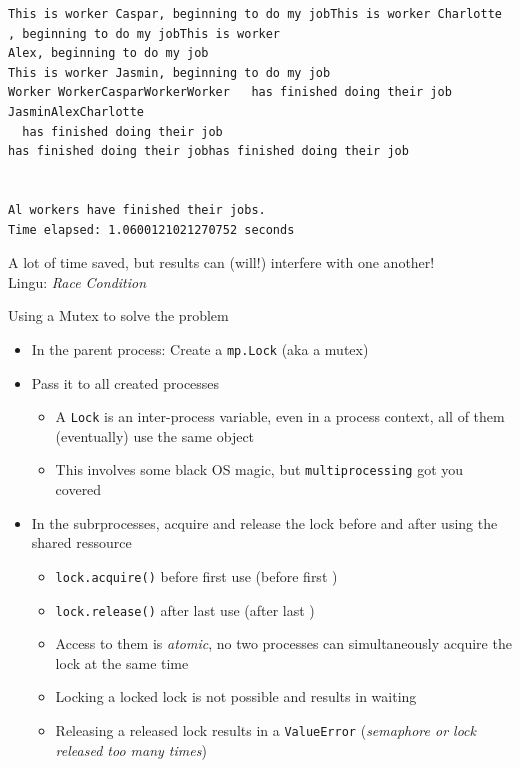 
\begin{frame}[fragile]
%
\begin{cmdbox}
\begin{verbatim}
This is worker Caspar, beginning to do my jobThis is worker Charlotte
, beginning to do my jobThis is worker 
Alex, beginning to do my job
This is worker Jasmin, beginning to do my job
Worker WorkerCasparWorkerWorker   has finished doing their job JasminAlexCharlotte
  has finished doing their job 
has finished doing their jobhas finished doing their job


Al workers have finished their jobs.
Time elapsed: 1.0600121021270752 seconds
\end{verbatim}
\end{cmdbox}

\begin{center}
\Thus A lot of time saved, but results can (will!) interfere with one another!\\
\Thus Lingu: \emph{Race Condition}
\end{center}
%
\end{frame}


\begin{frame}[fragile]{Using a Mutex to solve the problem}
%
\begin{itemize}
\item In the parent process: Create a \texttt{mp.Lock} (aka a mutex)
\item Pass it to all created processes
	\begin{itemize}
	\item A \texttt{Lock} is an inter-process variable, \ie even in a process context, all of them (eventually) use the same object
	\item This involves some black OS magic, but \texttt{multiprocessing} got you covered
	\end{itemize}
\item In the subrprocesses, acquire and release the lock before and after using the shared ressource
	\begin{itemize}
	\item \texttt{lock.acquire()} before first use (\zB before first )
	\item \texttt{lock.release()} after last use (\zB after last )
	\item Access to them is \emph{atomic}, \ie no two processes can simultaneously acquire the lock at the same time
	\item Locking a locked lock is not possible and results in waiting
	\item Releasing a released lock results in a \texttt{ValueError} (\emph{semaphore or lock released too many times})
	\end{itemize}
\end{itemize}
%
\end{frame}

